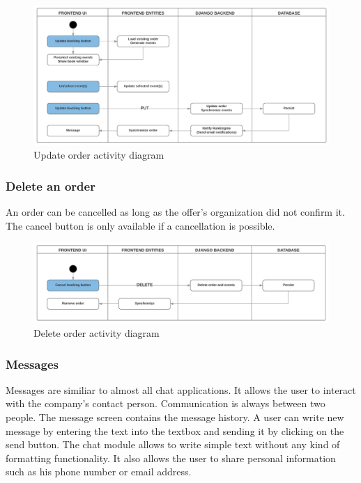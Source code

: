 \documentclass[11pt]{article} %
\begin{document}
\begin{figure}[H]
\begin{center}
\includegraphics[width=1.0\textwidth]{order_put_activity_diagram}
\end{center}
\caption{Update order activity diagram}
\label{fig:order_put_activity_diagram}
\end{figure}


\subsubsection{Delete an order}
An order can be cancelled as long as the offer’s organization did not confirm it. The cancel button is only available if a cancellation is possible.

\begin{figure}[H]
\begin{center}
\includegraphics[width=1.0\textwidth]{order_delete_activity_diagram}
\end{center}
\caption{Delete order activity diagram}
\label{fig:order_delete_activity_diagram}
\end{figure}

\subsubsection{Messages}
Messages are similiar to almost all chat applications. It allows the user to interact with the company’s contact person. Communication is always between two people. The message screen contains the message history. A user can write new message by entering the text into the textbox and sending it by clicking on the send button. The chat module allows to write simple text without any kind of formatting functionality. It also allows the user to share personal information such as his phone number or email address. 
\end{document}
